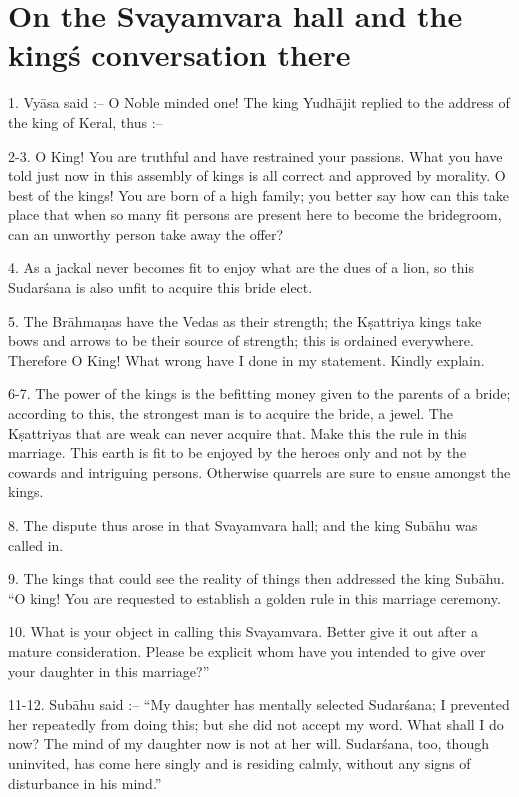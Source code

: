 \chapter{On the Svayamvara hall and the king\'s conversation there}

1. Vy\=asa said :-- O Noble minded one! The king Yudh\=ajit replied to the address of the king of Keral, thus :--

2-3. O King! You are truthful and have restrained your passions. What you have told just now in this assembly of kings is all correct and approved by morality. O best of the kings! You are born of a high family; you better say how can this take place that when so many fit persons are present here to become the bridegroom, can an unworthy person take away the offer?

4. As a jackal never becomes fit to enjoy what are the dues of a lion, so this Sudar\'sana is also unfit to acquire this bride elect.

5. The Br\=ahma\d{n}as have the Vedas as their strength; the K\d{s}attriya kings take bows and arrows to be their source of strength; this is ordained everywhere. Therefore O King! What wrong have I done in my statement. Kindly explain.

6-7. The power of the kings is the befitting money given to the parents of a bride; according to this, the strongest man is to acquire the bride, a jewel. The K\d{s}attriyas that are weak can never acquire that. Make this the rule in this marriage. This earth is fit to be enjoyed by the heroes only and not by the cowards and intriguing persons. Otherwise quarrels are sure to ensue amongst the kings.

8. The dispute thus arose in that Svayamvara hall; and the king Sub\=ahu was called in.

9. The kings that could see the reality of things then addressed the king Sub\=ahu. ``O king! You are requested to establish a golden rule in this marriage ceremony.

10. What is your object in calling this Svayamvara. Better give it out after a mature consideration. Please be explicit whom have you intended to give over your daughter in this marriage?''

11-12. Sub\=ahu said :-- ``My daughter has mentally selected Sudar\'sana; I prevented her repeatedly from doing this; but she did not accept my word. What shall I do now? The mind of my daughter now is not at her will. Sudar\'sana, too, though uninvited, has come here singly and is residing calmly, without any signs of disturbance in his mind.''

